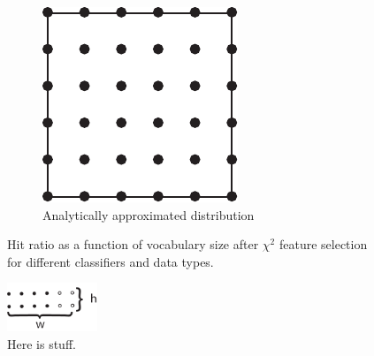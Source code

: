 \begin{figure}[H]
\begin{subfigure}[b]{\figwidth}
		\includegraphics[width=\textwidth]{img/Square.pdf}
		\caption{Analytically approximated distribution}
		\label{fig:hitratio-mn}
	\end{subfigure}
	\caption{Hit ratio as a function of vocabulary size after $\chi^2$ feature selection for different classifiers and data types.}
	\label{fig:hitratio}
\end{figure}

\begin{figure}[H]
	\centering
	\includegraphics[width=0.24\textwidth]{img/heightwidth.pdf}
	\caption{Here is stuff.}
	\label{fig:hitratio}
\end{figure}